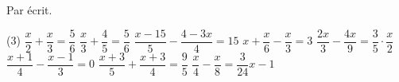 \documentclass[a4paper,12pt]{report}
\begin{document}
Par écrit.
	\begin{tasks}(3)
\task $\dfrac{x}{2}+\dfrac{x}{3}=\dfrac{5}{6}$
\task $\dfrac{x}{3}+\dfrac{4}{5}=\dfrac{5}{6}$
\task $\dfrac{x-15}{5}-\dfrac{4-3 x}{4}=15$
\task $x+\dfrac{x}{6}-\dfrac{x}{3}=3$
\task $\dfrac{2 x}{3}-\dfrac{4 x}{9}=\dfrac{3}{5} \cdot \dfrac{x}{2}$
\task $\dfrac{x+1}{4}-\dfrac{x-1}{3}=0$
\task $\dfrac{x+3}{5}+\dfrac{x+3}{4}=\dfrac{9}{5}$
\task $\dfrac{x}{4}-\dfrac{x}{8}=\dfrac{3}{24} x-1$
	\end{tasks}
	\begin{comment}
\begin{exo}[1]
Résoudre quatre fois de suite l'équation $\dfrac{x}{2}-3 x=\dfrac{5}{4}+x$, en utilisant la méthode proposée :
	\begin{tasks}
\task Votre manière de faire. 

(Dans les méthodes b), c) et d), simplifier au fur et à mesure l'expression obtenue.)
\task $\left[P E_2\right]$, en multipliant par 4 ; puis $\left[P E_1\right]$, en ajoutant $-4 x$; puis $\left[P E_2\right]$, en multipliant par $-\dfrac{1}{14}$.
\task $\left[P E_1\right]$, en ajoutant $-x$; puis $\left[P E_2\right]$, en multipliant par 2 ; puis $\left[P E_2\right]$, en multipliant par $-\dfrac{1}{7}$.
\task $\left[P E_1\right]$, en ajoutant $\dfrac{5}{2} x$; puis $\left[P E_1\right]$, en ajoutant $-\dfrac{5}{4} ;$ puis $\left[P E_2\right]$, en multipliant par $\dfrac{2}{7}$.
	\end{tasks}
\end{exo}

	\end{comment}
\end{document}
